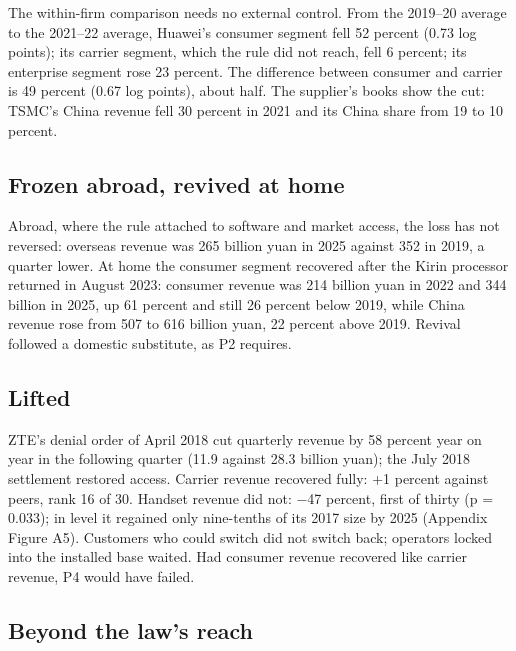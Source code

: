 \documentclass[12pt]{article}
\begin{document}
The within-firm comparison needs no external control. From the 2019--20 average to the 2021--22 average, Huawei's consumer segment fell 52 percent (0.73 log points); its carrier segment, which the rule did not reach, fell 6 percent; its enterprise segment rose 23 percent. The difference between consumer and carrier is 49 percent (0.67 log points), about half. The supplier's books show the cut: TSMC's China revenue fell 30 percent in 2021 and its China share from 19 to 10 percent.

\subsection{Frozen abroad, revived at home}

Abroad, where the rule attached to software and market access, the loss has not reversed: overseas revenue was 265 billion yuan in 2025 against 352 in 2019, a quarter lower. At home the consumer segment recovered after the Kirin processor returned in August 2023: consumer revenue was 214 billion yuan in 2022 and 344 billion in 2025, up 61 percent and still 26 percent below 2019, while China revenue rose from 507 to 616 billion yuan, 22 percent above 2019. Revival followed a domestic substitute, as P2 requires.

\subsection{Lifted}

ZTE's denial order of April 2018 cut quarterly revenue by 58 percent year on year in the following quarter (11.9 against 28.3 billion yuan); the July 2018 settlement restored access. Carrier revenue recovered fully: +1 percent against peers, rank 16 of 30. Handset revenue did not: −47 percent, first of thirty (p = 0.033); in level it regained only nine-tenths of its 2017 size by 2025 (Appendix Figure A5). Customers who could switch did not switch back; operators locked into the installed base waited. Had consumer revenue recovered like carrier revenue, P4 would have failed.

\subsection{Beyond the law's reach}
\end{document}
